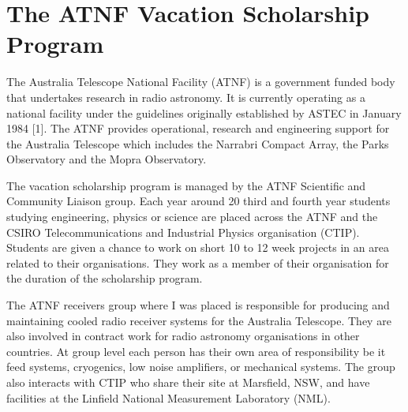 
\section{The ATNF Vacation Scholarship Program}

The Australia Telescope National Facility (ATNF) is a government funded body that undertakes research in radio astronomy. It is currently operating as a national facility under the guidelines originally established by ASTEC in January 1984 [1]. The ATNF provides operational, research and engineering support for the Australia Telescope which includes the Narrabri Compact Array, the Parks Observatory and the Mopra Observatory. 

The vacation scholarship program is managed by the ATNF Scientific and Community Liaison group. Each year around 20 third and fourth year students studying engineering, physics or science are placed across the ATNF and the CSIRO Telecommunications and Industrial Physics organisation (CTIP). Students are given a chance to work on short 10 to 12 week projects in an area related to their organisations. They work as a member of their organisation for the duration of the scholarship program.

The ATNF receivers group where I was placed is responsible for producing and maintaining cooled radio receiver systems for the Australia Telescope. They are also involved in contract work for radio astronomy organisations in other countries. At group level each person has their own area of responsibility be it feed systems, cryogenics, low noise amplifiers, or mechanical systems. The group also interacts with CTIP who share their site at Marsfield, NSW, and have facilities at the Linfield National Measurement Laboratory (NML).
